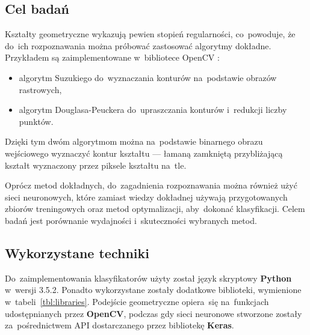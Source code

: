 \documentclass[11pt,a4paper]{article}
\begin{document}
\subsection{Cel badań}

Kształty geometryczne wykazują pewien stopień regularności, co~powoduje, że do~ich rozpoznawania można próbować zastosować algorytmy dokładne.
Przykładem są zaimplementowane w~bibliotece OpenCV \cite{opencv}:
\begin{itemize}
    \item algorytm Suzukiego \cite{suzuki1985} do~wyznaczania konturów na~podstawie obrazów rastrowych,
    \item algorytm Douglasa-Peuckera \cite{douglas1973} do~upraszczania konturów i~redukcji liczby punktów.
\end{itemize}
Dzięki tym dwóm algorytmom można na~podstawie binarnego obrazu wejściowego wyznaczyć kontur kształtu --- łamaną zamkniętą przybliżającą kształt wyznaczony przez piksele kształtu na~tle.

Oprócz metod dokładnych, do~zagadnienia rozpoznawania można również użyć sieci neuronowych, które zamiast wiedzy dokładnej używają przygotowanych zbiorów treningowych oraz metod optymalizacji, aby~dokonać klasyfikacji.
Celem badań jest porównanie wydajności i~skuteczności wybranych metod.

\newpage
\subsection{Wykorzystane techniki}

Do~zaimplementowania klasyfikatorów użyty został język skryptowy \textbf{Python} w~wersji 3.5.2.
Ponadto wykorzystane zostały dodatkowe biblioteki, wymienione w~tabeli~\ref{tbl:libraries}.
Podejście geometryczne opiera~się na~funkcjach udostępnianych przez \textbf{OpenCV}, podczas gdy sieci neuronowe stworzone zostały za~pośrednictwem API dostarczanego przez bibliotekę \textbf{Keras}.
\end{document}
